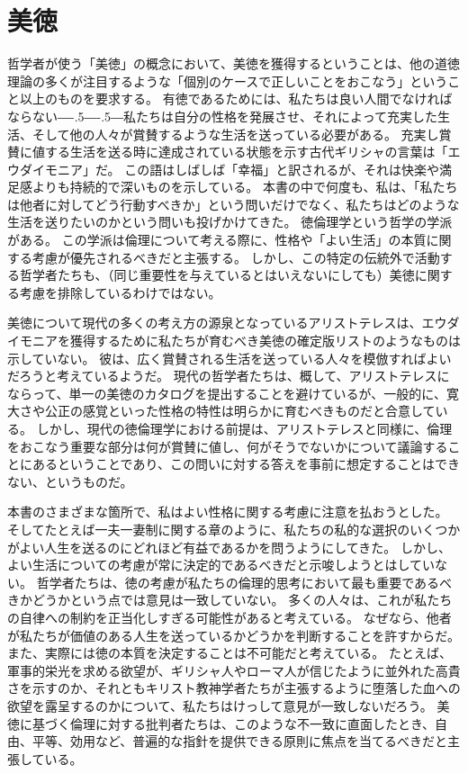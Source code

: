 \documentclass[paper=a4,book,openany]{jlreq}
\def\DDASH{―\kern-.5\zw―\kern-.5\zw―}
\begin{document}
\section{美徳}

哲学者が使う「美徳」の概念において、美徳を獲得するということは、他の道徳理論の多くが注目するような「個別のケースで正しいことをおこなう」ということ以上のものを要求する。
有徳であるためには、私たちは良い人間でなければならない{\DDASH}私たちは自分の性格を発展させ、それによって充実した生活、そして他の人々が賞賛するような生活を送っている必要がある。
充実し賞賛に値する生活を送る時に達成されている状態を示す古代ギリシャの言葉は「エウダイモニア」だ。
この語はしばしば「幸福」と訳されるが、それは快楽や満足感よりも持続的で深いものを示している。
本書の中で何度も、私は、「私たちは他者に対してどう行動すべきか」という問いだけでなく、私たちはどのような生活を送りたいのかという問いも投げかけてきた。
徳倫理学という哲学の学派がある。
この学派は倫理について考える際に、性格や「よい生活」の本質に関する考慮が優先されるべきだと主張する。
しかし、この特定の伝統外で活動する哲学者たちも、（同じ重要性を与えているとはいえないにしても）美徳に関する考慮を排除しているわけではない。

美徳について現代の多くの考え方の源泉となっているアリストテレスは、エウダイモニアを獲得するために私たちが育むべき美徳の確定版リストのようなものは示していない。
彼は、広く賞賛される生活を送っている人々を模倣すればよいだろうと考えているようだ。
現代の哲学者たちは、概して、アリストテレスにならって、単一の美徳のカタログを提出することを避けているが、一般的に、寛大さや公正の感覚といった性格の特性は明らかに育むべきものだと合意している。
しかし、現代の徳倫理学における前提は、アリストテレスと同様に、倫理をおこなう重要な部分は何が賞賛に値し、何がそうでないかについて議論することにあるということであり、この問いに対する答えを事前に想定することはできない、というものだ。

本書のさまざまな箇所で、私はよい性格に関する考慮に注意を払おうとした。
そしてたとえば一夫一妻制に関する章のように、私たちの私的な選択のいくつかがよい人生を送るのにどれほど有益であるかを問うようにしてきた。
しかし、よい生活についての考慮が常に決定的であるべきだと示唆しようとはしていない。
哲学者たちは、徳の考慮が私たちの倫理的思考において最も重要であるべきかどうかという点では意見は一致していない。
多くの人々は、これが私たちの自律への制約を正当化しすぎる可能性があると考えている。
なぜなら、他者が私たちが価値のある人生を送っているかどうかを判断することを許すからだ。
また、実際には徳の本質を決定することは不可能だと考えている。
たとえば、軍事的栄光を求める欲望が、ギリシャ人やローマ人が信じたように並外れた高貴さを示すのか、それともキリスト教神学者たちが主張するように堕落した血への欲望を露呈するのかについて、私たちはけっして意見が一致しないだろう。
美徳に基づく倫理に対する批判者たちは、このような不一致に直面したとき、自由、平等、効用など、普遍的な指針を提供できる原則に焦点を当てるべきだと主張している。
\end{document}
